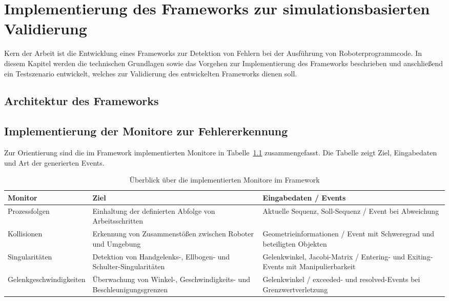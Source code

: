 \chapter{Implementierung des Frameworks zur simulationsbasierten
Validierung}
\label{cap:framework}
Kern der Arbeit ist die Entwicklung eines Frameworks zur Detektion von Fehlern
bei der Ausführung von Roboterprogrammcode. In diesem Kapitel werden
die technischen Grundlagen sowie das Vorgehen zur
Implementierung des Frameworks beschrieben und anschließend ein Testszenario
entwickelt, welches zur Validierung des entwickelten Frameworks dienen soll.

\section{Architektur des Frameworks}
\label{sec:architektur_frameowork}


\section{Implementierung der Monitore zur Fehlererkennung}
\label{sec:implementierungMonitore}

Zur Orientierung sind die im Framework implementierten Monitore in
Tabelle~\ref{tab:monitor_overview_arch} zusammengefasst. Die Tabelle zeigt Ziel,
Eingabedaten und Art der generierten Events.

\begin{table}[H]
  \centering
  \small
  \begin{tabularx}{\textwidth}{lXX}
    \toprule
    \textbf{Monitor}        & \textbf{Ziel}
    & \textbf{Eingabedaten / Events} \\
    \midrule
    Prozessfolgen           & Einhaltung der definierten Abfolge von
    Arbeitsschritten               &
    Aktuelle Sequenz, Soll-Sequenz / Event bei Abweichung
    \\
    \addlinespace
    Kollisionen             & Erkennung von Zusammenstößen zwischen
    Roboter und Umgebung            &
    Geometrieinformationen / Event mit Schweregrad und beteiligten
    Objekten                                                          \\
    \addlinespace
    Singularitäten          & Detektion von \mbox{Handgelenks-,} Ellbogen- und
    Schulter-Singularitäten              &
    Gelenkwinkel, Jacobi-Matrix / Entering- und Exiting-Events mit
    Manipulierbarkeit                                                      \\
    \addlinespace
    Gelenkgeschwindigkeiten & Überwachung von Winkel-,
    Geschwindigkeits- und Beschleunigungsgrenzen &
    Gelenkwinkel / exceeded- und resolved-Events bei
    Grenzwertverletzung
    \\
    \bottomrule
  \end{tabularx}
  \caption{Überblick über die implementierten Monitore im Framework}
  \label{tab:monitor_overview_arch}
\end{table}

